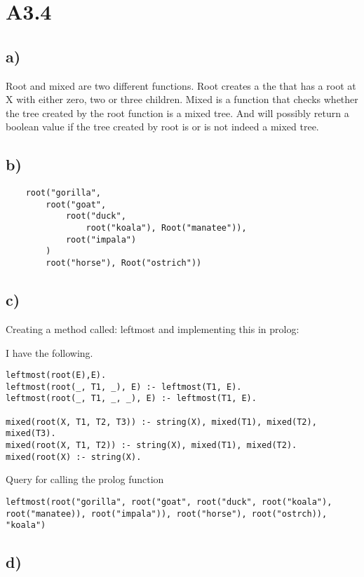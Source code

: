 \section{A3.4}
\subsection{a)}
Root and mixed are two different functions.
Root creates a the that has a root at X with either zero, two or three children.
Mixed is a function that checks whether the tree created by the root function is
a mixed tree. And will possibly return a boolean value if the tree created by root
is or is not indeed a mixed tree.

\subsection{b)}
\begin{verbatim}
    root("gorilla",
        root("goat",
            root("duck",
                root("koala"), Root("manatee")),
            root("impala")
        )
        root("horse"), Root("ostrich"))
\end{verbatim}

\subsection{c)}
Creating a method called: leftmost
and implementing this in prolog:

I have the following.

\begin{verbatim}
leftmost(root(E),E).
leftmost(root(_, T1, _), E) :- leftmost(T1, E).
leftmost(root(_, T1, _, _), E) :- leftmost(T1, E).

mixed(root(X, T1, T2, T3)) :- string(X), mixed(T1), mixed(T2), mixed(T3).
mixed(root(X, T1, T2)) :- string(X), mixed(T1), mixed(T2).
mixed(root(X) :- string(X).
\end{verbatim}

Query for calling the prolog function
\begin{verbatim}
leftmost(root("gorilla", root("goat", root("duck", root("koala"), root("manatee)), root("impala")), root("horse"), root("ostrch)), "koala")
\end{verbatim}

\subsection{d)}
